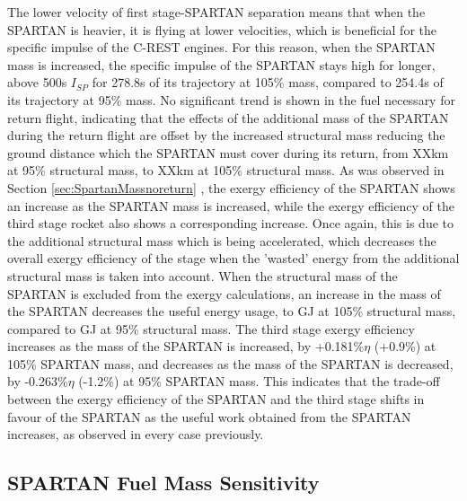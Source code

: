  The lower velocity of first stage-SPARTAN separation means that when the SPARTAN is heavier, it is flying at lower velocities, which is beneficial for the specific impulse of the C-REST engines. For this reason, when the SPARTAN mass is increased, the specific impulse of the SPARTAN stays high for longer, above 500s $I_{SP}$ for 278.8s of its trajectory at 105\% mass, compared to 254.4s of its trajectory at 95\% mass. 
 No  significant trend is shown in the fuel necessary for return flight, indicating that the effects of the  additional mass of the SPARTAN during the return flight are offset by the increased structural mass reducing the ground distance which the SPARTAN must cover during its return, from XXkm at 95\% structural mass, to XXkm at 105\% structural mass. 
As was observed in Section \ref{sec:SpartanMassnoreturn} , the exergy efficiency of the SPARTAN shows an increase as the SPARTAN mass is increased, while the exergy efficiency of the third stage rocket also shows a corresponding increase. 
Once again, this is due to the additional structural mass which is being accelerated, which decreases the overall exergy efficiency of the stage when the 'wasted' energy from the additional structural mass is taken into account. When the structural mass of the SPARTAN is excluded from the exergy calculations, an increase in the mass of the SPARTAN decreases the useful energy usage, to \secondExergythirdStagemSPARTANOneHundredFive GJ at 105\% structural mass, compared to \secondExergythirdStagemSPARTANNinetyFive GJ at 95\% structural mass. 
The third stage exergy efficiency increases as the mass of the SPARTAN is increased, by +0.181\%$\eta$ (+0.9\%) at 105\% SPARTAN mass, and decreases as the mass of the SPARTAN is decreased, by -0.263\%$\eta$ (-1.2\%) at 95\% SPARTAN mass. This indicates that the trade-off between the exergy efficiency of the SPARTAN and the third stage shifts in favour of the SPARTAN as the useful work obtained from the SPARTAN increases, as observed in every case previously. 





\subsection{SPARTAN Fuel Mass Sensitivity}

